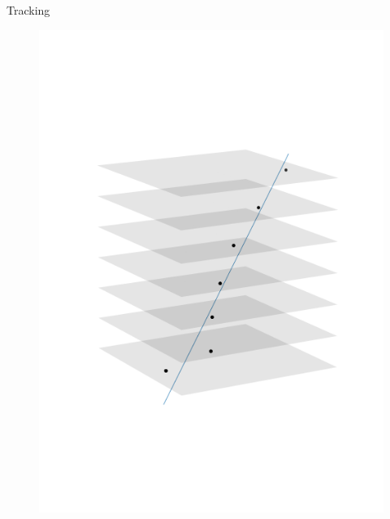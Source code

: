 \documentclass{beamer}
\begin{document}
\begin{frame}[fragile]{Tracking}
\begin{minipage}{.32\textwidth}
\begin{figure}[H]
	    \includegraphics[trim=0 80 0 80,clip,width=\textwidth]{example_112000.png}
	\end{figure}
    \end{minipage}
    \begin{minipage}{.32\textwidth}
	\begin{figure}[H]
	    \centering

\end{figure}
\end{minipage}
\end{frame}
\end{document}
